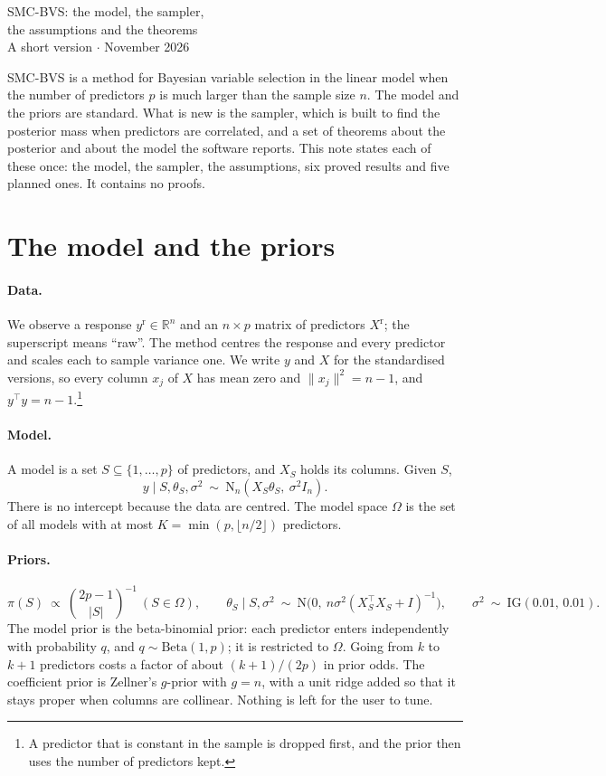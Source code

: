 \documentclass[11pt]{article}
\newcommand{\R}{\mathbb{R}}
\newcommand{\N}{\mathrm{N}}
\newcommand{\abs}[1]{\lvert #1\rvert}
\newcommand{\norm}[1]{\lVert #1\rVert}
\newcommand{\yr}{y^{\mathrm r}}
\newcommand{\Xr}{X^{\mathrm r}}
\newcommand{\Om}{\Omega}
\theoremstyle{plain}
\theoremstyle{definition}
\begin{document}
\begin{center}
{\LARGE SMC-BVS: the model, the sampler,\\[3pt] the assumptions and the theorems}\\[8pt]
{\large A short version \quad$\cdot$ November 2026}
\end{center}
\medskip

\noindent SMC-BVS is a method for Bayesian variable selection in the linear model when the number of predictors $p$ is
much larger than the sample size $n$. The model and the priors are standard. What is new is the sampler, which is built to
find the posterior mass when predictors are correlated, and a set of theorems about the posterior and about the model the
software reports. This note states each of these once: the model, the sampler, the assumptions, six proved results and
five planned ones. It contains no proofs.

\section{The model and the priors}

\paragraph{Data.} We observe a response $\yr\in\R^n$ and an $n\times p$ matrix of predictors $\Xr$; the superscript
means ``raw''. The method centres the response and every predictor and scales each to sample variance one. We write $y$
and $X$ for the standardised versions, so every column $x_j$ of $X$ has mean zero and $\norm{x_j}^2=n-1$, and
$y^\top y=n-1$.\footnote{A predictor that is constant in the sample is dropped first, and the prior then uses the number of predictors kept.}

\paragraph{Model.} A model is a set $S\subseteq\{1,\dots,p\}$ of predictors, and $X_S$ holds its columns. Given $S$,
\[
  y\mid S,\theta_S,\sigma^2\ \sim\ \N_n(X_S\theta_S,\ \sigma^2I_n).
\]
There is no intercept because the data are centred. The model space $\Om$ is the set of all models with at most
$K=\min(p,\lfloor n/2\rfloor)$ predictors.

\paragraph{Priors.}
\[
  \pi(S)\ \propto\ \binom{2p-1}{\abs{S}}^{-1}\ (S\in\Om),\qquad
  \theta_S\mid S,\sigma^2\ \sim\ \N\big(0,\ n\sigma^2(X_S^\top X_S+I)^{-1}\big),\qquad
  \sigma^2\ \sim\ \mathrm{IG}(0.01,\,0.01).
\]
The model prior is the beta-binomial prior: each predictor enters independently with probability $q$, and
$q\sim\mathrm{Beta}(1,p)$; it is restricted to $\Om$. Going from $k$ to $k+1$ predictors costs a factor of about
$(k+1)/(2p)$ in prior odds. The coefficient prior is Zellner's $g$-prior with $g=n$, with a unit ridge added so that it
stays proper when columns are collinear. Nothing is left for the user to tune.
\end{document}
